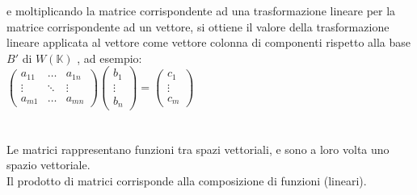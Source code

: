 \documentclass[a4paper, twoside, italian, 11pt]{book}
\newcommand{\K}{\mathbb K}
\begin{document}
\noindent
e moltiplicando la matrice corrispondente ad una trasformazione lineare per la matrice corrispondente ad un vettore, si ottiene il valore della trasformazione lineare applicata al vettore come vettore colonna di componenti rispetto alla base $B'$ di $W(\K)$ , ad esempio: \\

$\begin{pmatrix}
a_{11} & \dots & a_{1n} \\
\vdots & \ddots & \vdots \\
a_{m1} & \dots & a_{mn}
\end{pmatrix}
\begin{pmatrix}
b_1 \\
\vdots \\
b_n
\end{pmatrix} = 
\begin{pmatrix}
c_1 \\
\vdots \\
c_m
\end{pmatrix}
$ \\\\\\

\noindent
Le matrici rappresentano funzioni tra spazi vettoriali, e sono a loro volta uno spazio vettoriale.\\

\noindent
Il prodotto di matrici corrisponde alla composizione di funzioni (lineari).
\end{document}
